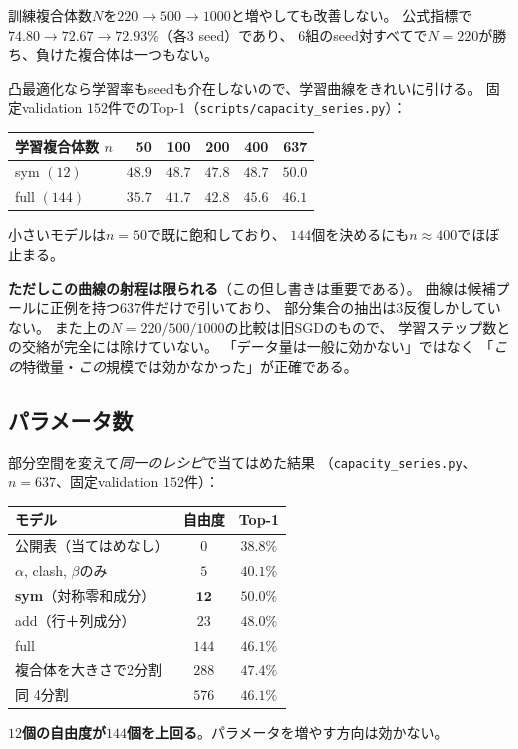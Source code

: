 \documentclass[11pt,a4paper]{article}
\begin{document}
訓練複合体数$N$を$220 \to 500 \to 1000$と増やしても改善しない。
公式指標で$74.80 \to 72.67 \to 72.93\%$（各3 seed）であり、
$6$組のseed対すべてで$N=220$が勝ち、負けた複合体は一つもない。

凸最適化なら学習率もseedも介在しないので、学習曲線をきれいに引ける。
固定validation $152$件でのTop-1（\texttt{scripts/capacity\_series.py}）：
\begin{center}
\begin{tabular}{lrrrrr}
\toprule
学習複合体数 $n$ & 50 & 100 & 200 & 400 & 637 \\
\midrule
sym $(12)$   & $48.9$ & $48.7$ & $47.8$ & $48.7$ & $50.0$ \\
full $(144)$ & $35.7$ & $41.7$ & $42.8$ & $45.6$ & $46.1$ \\
\bottomrule
\end{tabular}
\end{center}
小さいモデルは$n = 50$で既に飽和しており、
$144$個を決めるにも$n \approx 400$でほぼ止まる。

\textbf{ただしこの曲線の射程は限られる}（この但し書きは重要である）。
曲線は候補プールに正例を持つ$637$件だけで引いており、
部分集合の抽出は3反復しかしていない。
また上の$N = 220/500/1000$の比較は旧SGDのもので、
学習ステップ数との交絡が完全には除けていない。
「データ量は一般に効かない」ではなく
「\emph{この}特徴量・\emph{この}規模では効かなかった」が正確である。

\subsection{パラメータ数}

部分空間を変えて\emph{同一のレシピ}で当てはめた結果
（\texttt{capacity\_series.py}、$n = 637$、固定validation $152$件）：
\begin{center}
\begin{tabular}{lcc}
\toprule
モデル & 自由度 & Top-1 \\
\midrule
公開表（当てはめなし） & $0$ & $38.8\%$ \\
$\alpha$, clash, $\beta$のみ & $5$ & $40.1\%$ \\
\textbf{sym}（対称零和成分） & $\mathbf{12}$ & $\mathbf{50.0\%}$ \\
add（行＋列成分） & $23$ & $48.0\%$ \\
full & $144$ & $46.1\%$ \\
複合体を大きさで2分割 & $288$ & $47.4\%$ \\
同 4分割 & $576$ & $46.1\%$ \\
\bottomrule
\end{tabular}
\end{center}
\textbf{$12$個の自由度が$144$個を上回る}。パラメータを増やす方向は効かない。
\end{document}

